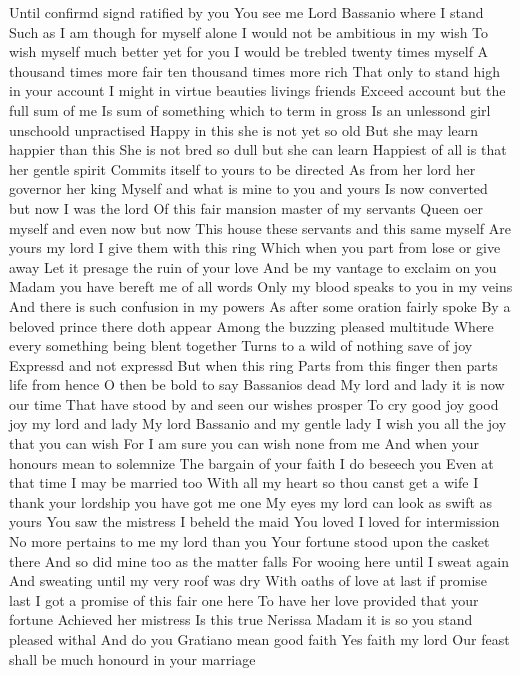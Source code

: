 Until confirmd signd ratified by you
You see me Lord Bassanio where I stand
Such as I am though for myself alone
I would not be ambitious in my wish
To wish myself much better yet for you
I would be trebled twenty times myself
A thousand times more fair ten thousand times more rich
That only to stand high in your account
I might in virtue beauties livings friends
Exceed account but the full sum of me
Is sum of something which to term in gross
Is an unlessond girl unschoold unpractised
Happy in this she is not yet so old
But she may learn happier than this
She is not bred so dull but she can learn
Happiest of all is that her gentle spirit
Commits itself to yours to be directed
As from her lord her governor her king
Myself and what is mine to you and yours
Is now converted but now I was the lord
Of this fair mansion master of my servants
Queen oer myself and even now but now
This house these servants and this same myself
Are yours my lord I give them with this ring
Which when you part from lose or give away
Let it presage the ruin of your love
And be my vantage to exclaim on you
Madam you have bereft me of all words
Only my blood speaks to you in my veins
And there is such confusion in my powers
As after some oration fairly spoke
By a beloved prince there doth appear
Among the buzzing pleased multitude
Where every something being blent together
Turns to a wild of nothing save of joy
Expressd and not expressd But when this ring
Parts from this finger then parts life from hence
O then be bold to say Bassanios dead
My lord and lady it is now our time
That have stood by and seen our wishes prosper
To cry good joy good joy my lord and lady
My lord Bassanio and my gentle lady
I wish you all the joy that you can wish
For I am sure you can wish none from me
And when your honours mean to solemnize
The bargain of your faith I do beseech you
Even at that time I may be married too
With all my heart so thou canst get a wife
I thank your lordship you have got me one
My eyes my lord can look as swift as yours
You saw the mistress I beheld the maid
You loved I loved for intermission
No more pertains to me my lord than you
Your fortune stood upon the casket there
And so did mine too as the matter falls
For wooing here until I sweat again
And sweating until my very roof was dry
With oaths of love at last if promise last
I got a promise of this fair one here
To have her love provided that your fortune
Achieved her mistress
Is this true Nerissa
Madam it is so you stand pleased withal
And do you Gratiano mean good faith
Yes faith my lord
Our feast shall be much honourd in your marriage
